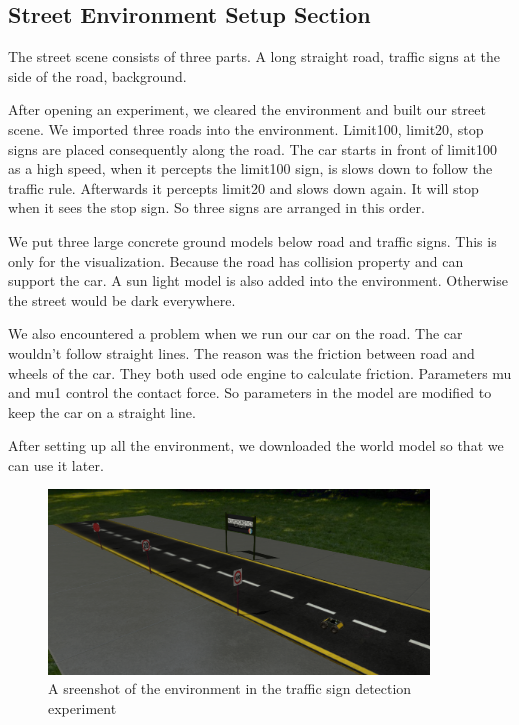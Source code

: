 \subsection{Street Environment Setup Section}
The street scene consists of three parts. A long straight road, traffic signs at the side of the road, background.

After opening an experiment, we cleared the environment and built our street scene. We imported three roads into the environment. Limit100, limit20, stop signs are placed consequently along the road. The car starts in front of limit100 as a high speed, when it percepts the limit100 sign, is slows down to follow the traffic rule. Afterwards it percepts limit20 and slows down again. It will stop when it sees the stop sign. So three signs are arranged in this order.


We put three large concrete ground models below road and traffic signs. This is only for the visualization. Because the road has collision property and can support the car. A sun light model is also added into the environment. Otherwise the street would be dark everywhere.

We also encountered a problem when we run our car on the road. The car wouldn't follow straight lines. The reason was the friction between road and wheels of the car. They both used ode engine to calculate friction. Parameters mu and mu1 control the contact force. So parameters in the model are modified to keep the car on a straight line. 

After setting up all the environment, we downloaded the world model so that we can use it later.


\begin{figure}
  \centering
  \includegraphics[width=0.9\textwidth]{chapter/images/img-3.png}
  \caption{A sreenshot of the environment in the traffic sign detection experiment}
  \label{fig:img}
\end{figure}


